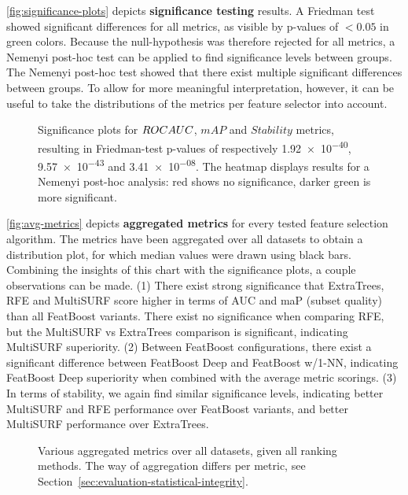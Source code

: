 \documentclass{article}
\begin{document}
\autoref{fig:significance-plots} depicts \textbf{significance testing} results. A Friedman test showed significant differences for all metrics, as visible by p-values of $< 0.05$ in green colors. Because the null-hypothesis was therefore rejected for all metrics, a Nemenyi post-hoc test can be applied to find significance levels between groups. The Nemenyi post-hoc test showed that there exist multiple significant differences between groups. To allow for more meaningful interpretation, however, it can be useful to take the distributions of the metrics per feature selector into account.

\begin{figure}[ht]
\centering



\caption{Significance plots for $ROC\-AUC$, $mAP$ and $Stability$ metrics, resulting in Friedman-test p-values of respectively \num{1.92e-40}, \num{9.57e-43} and \num{3.41e-08}. The heatmap displays results for a Nemenyi post-hoc analysis: red shows no significance, darker green is more significant.}
\label{fig:significance-plots}
\end{figure}

\autoref{fig:avg-metrics} depicts \textbf{aggregated metrics} for every tested feature selection algorithm. The metrics have been aggregated over all datasets to obtain a distribution plot, for which median values were drawn using black bars. Combining the insights of this chart with the significance plots, a couple observations can be made. (1) There exist strong significance that ExtraTrees, RFE and MultiSURF score higher in terms of AUC and maP (subset quality) than all FeatBoost variants. There exist no significance when comparing RFE, but the MultiSURF vs ExtraTrees comparison is significant, indicating MultiSURF superiority. (2) Between FeatBoost configurations, there exist a significant difference between FeatBoost Deep and FeatBoost w/1-NN, indicating FeatBoost Deep superiority when combined with the average metric scorings. (3) In terms of stability, we again find similar significance levels, indicating better MultiSURF and RFE performance over FeatBoost variants, and better MultiSURF performance over ExtraTrees.

\begin{figure}[ht]
\centering

\caption{Various aggregated metrics over all datasets, given all ranking methods. The way of aggregation differs per metric, see Section~\ref{sec:evaluation-statistical-integrity}.}
\label{fig:avg-metrics}
\end{figure}
\end{document}
